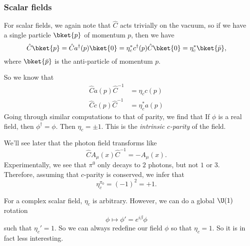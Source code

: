 \documentclass[a4paper]{article}
\begin{document}
\subsubsection*{Scalar fields}
For scalar fields, we again note that $\hat{C}$ acts trivially on the vacuum, so if we have a single particle $\bket{p}$ of momentum $p$, then we have
\[
  \hat{C}\bket{p} = \hat{C} a^\dagger(p) \bket{0} = \eta_c^* c^\dagger(p) \hat{C} \bket{0} = \eta_c^* \bket{\bar{p}},
\]
where $\bket{\bar{p}}$ is the anti-particle of momentum $p$.

So we know that
\begin{align*}
  \hat{C} a(p)\hat{C}^{-1} &= \eta_c c(p)\\
  \hat{C} c(p) \hat{C}^{-1} &= \eta_c^* a(p)
\end{align*}
Going through similar computations to that of parity, we find that
If $\phi$ is a real field, then $\phi^\dagger = \phi$. Then $\eta_c = \pm 1$. This is the \emph{intrinsic $c$-parity} of the field.
\begin{eg}
  We'll see later that the photon field transforms like
  \[
    \hat{C}A_\mu(x) \hat{C}^{-1} = - A_\mu(x).
  \]
  Experimentally, we see that $\pi^0$ only decays to $2$ photons, but not $1$ or $3$. Therefore, assuming that $c$-parity is conserved, we infer that
  \[
    \eta_c^{\pi_0} = (-1)^2 = +1.
  \]
\end{eg}

For a complex scalar field, $\eta_c$ is arbitrary. However, we can do a global $\U(1)$ rotation
\[
  \phi \mapsto \phi' = e^{i \beta} \phi
\]
such that $\eta_c' = 1$. So we can always redefine our field $\phi$ so that $\eta_c = 1$. So it is in fact less interesting.
\end{document}
